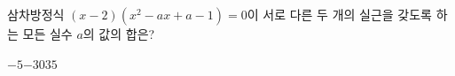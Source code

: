 삼차방정식 $(x-2)(x^2-ax+a-1)=0$이 서로 다른 두 개의 실근을 갖도록 하는 모든 실수 $a$의 값의 합은?
\begin{choices32}{$-5$}{$-3$}{$0$}{$3$}{$5$}\end{choices32}
